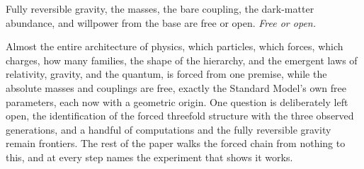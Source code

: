 \begin{finding}
Fully reversible gravity, the masses, the bare coupling, the dark-matter abundance, and willpower from the base are free or open. \emph{Free or open.}
\end{finding}

Almost the entire architecture of physics, which particles, which forces, which charges, how many families, the shape of the hierarchy, and the emergent laws of relativity, gravity, and the quantum, is forced from one premise, while the absolute masses and couplings are free, exactly the Standard Model's own free parameters, each now with a geometric origin. One question is deliberately left open, the identification of the forced threefold structure with the three observed generations, and a handful of computations and the fully reversible gravity remain frontiers. The rest of the paper walks the forced chain from nothing to this, and at every step names the experiment that shows it works.
